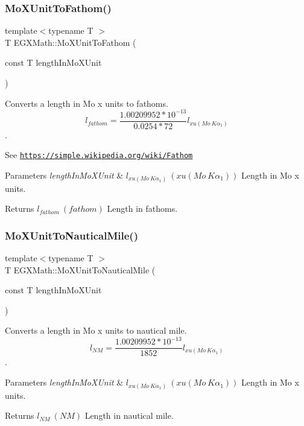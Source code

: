 \subsubsection{\texorpdfstring{Mo\+X\+Unit\+To\+Fathom()}{MoXUnitToFathom()}}
{\footnotesize\ttfamily template$<$typename T $>$ \\
T E\+G\+X\+Math\+::\+Mo\+X\+Unit\+To\+Fathom (\begin{DoxyParamCaption}\item[{const T}]{length\+In\+Mo\+X\+Unit }\end{DoxyParamCaption})}



Converts a length in Mo x units to fathoms. \[ l_{fathom}= \frac{1.00209952*10^{-13}}{0.0254 * 72} l_{xu(Mo\ K\alpha_1)} \]. 

See \href{https://simple.wikipedia.org/wiki/Fathom}{\tt https\+://simple.\+wikipedia.\+org/wiki/\+Fathom} 
\begin{DoxyParams}{Parameters}
{\em length\+In\+Mo\+X\+Unit} & $ l_{xu(Mo\ K\alpha_1)}\ (xu(Mo\ K\alpha_1))$ Length in Mo x units. \\
\hline
\end{DoxyParams}
\begin{DoxyReturn}{Returns}
$ l_{fathom}\ (fathom)$ Length in fathoms. 
\end{DoxyReturn}
\mbox{\label{group___e_g_x_math-_conversions-_length_conversions-_non-_s_i-_mo_x_unit-_nautical_ga034fe0d8e6dbb0b0a588099a5b9d2c51}} 
\subsubsection{\texorpdfstring{Mo\+X\+Unit\+To\+Nautical\+Mile()}{MoXUnitToNauticalMile()}}
{\footnotesize\ttfamily template$<$typename T $>$ \\
T E\+G\+X\+Math\+::\+Mo\+X\+Unit\+To\+Nautical\+Mile (\begin{DoxyParamCaption}\item[{const T}]{length\+In\+Mo\+X\+Unit }\end{DoxyParamCaption})}



Converts a length in Mo x units to nautical mile. \[ l_{NM}= \frac{1.00209952*10^{-13}}{1852} l_{xu(Mo\ K\alpha_1)} \]. 


\begin{DoxyParams}{Parameters}
{\em length\+In\+Mo\+X\+Unit} & $ l_{xu(Mo\ K\alpha_1)}\ (xu(Mo\ K\alpha_1))$ Length in Mo x units. \\
\hline
\end{DoxyParams}
\begin{DoxyReturn}{Returns}
$ l_{NM}\ (NM)$ Length in nautical mile. 
\end{DoxyReturn}

